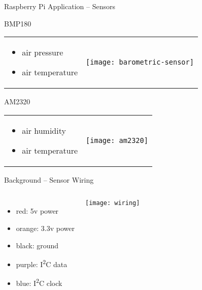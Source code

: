 \documentclass[aspectratio=169]{beamer}
\begin{document}
  \begin{frame}{Raspberry Pi Application -- Sensors}
      \begin{block}{BMP180}
        \begin{tabularx}{\textwidth}{XC}
          \begin{itemize}
            \item air pressure
            \item air temperature
          \end{itemize}
          &
          \texttt{[image: barometric-sensor]}
        \end{tabularx}
      \end{block}

      \begin{block}{AM2320}
        \begin{tabularx}{\textwidth}{XC}

          \begin{itemize}
            \item air humidity
            \item air temperature
          \end{itemize}
          &
          \texttt{[image: am2320]}
        \end{tabularx}
      \end{block}
  \end{frame}

  \begin{frame}{Background -- Sensor Wiring}
    \begin{columns}

      \begin{itemize}
        \item {\color{red}red:} 5v power
        \item {\color{orange}orange:} 3.3v power
        \item {\color{black}black:} ground
        \item {\color{purple}purple:} I\textsuperscript{2}C data
        \item {\color{blue}blue:} I\textsuperscript{2}C clock
      \end{itemize}

      \vspace*{1em}
      \texttt{[image: wiring]}
    \end{columns}
  \end{frame}
\end{document}
